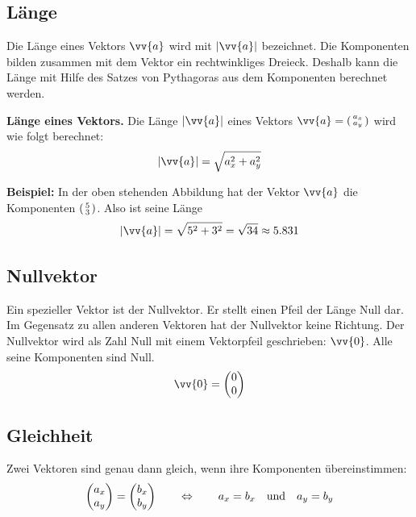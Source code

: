 \subsection{Länge}

Die Länge eines Vektors $\vv{a}$ wird mit $|\vv{a}|$ bezeichnet. Die Komponenten bilden zusammen mit dem Vektor ein rechtwinkliges Dreieck. Deshalb kann die Länge mit Hilfe des Satzes von Pythagoras aus dem Komponenten berechnet werden.

\begin{center}
\end{center}

\begin{theorem}
  \textbf{Länge eines Vektors.} Die Länge $|\vv{a}|$ eines Vektors $\vv{a} = \tvec{a_{x},a_{y}}$ wird wie folgt berechnet:
  \[
    |\vv{a}| = \sqrt{a_{x}^{2}+a_{y}^{2}}
  \]
\end{theorem}

\begin{example}
  \textbf{Beispiel:} In der oben stehenden Abbildung hat der Vektor $\vv{a}$ die Komponenten $\tvec{5,3}$. Also ist seine Länge
  \[
    |\vv{a}| = \sqrt{5^{2}+3^{2}} = \sqrt{34} \approx 5.831
  \]
\end{example}

\subsection{Nullvektor}

Ein spezieller Vektor ist der Nullvektor. Er stellt einen Pfeil der Länge Null dar. Im Gegensatz zu allen anderen Vektoren hat der Nullvektor keine Richtung. Der Nullvektor wird als Zahl Null mit einem Vektorpfeil geschrieben: $\vv{0}$. Alle seine Komponenten sind Null.
\[
  \vv{0} = \dvec{0,0}
\]

\subsection{Gleichheit}

Zwei Vektoren sind genau dann gleich, wenn ihre Komponenten übereinstimmen:
\[
  \dvec{a_{x},a_{y}} = \dvec{b_{x},b_{y}} \qquad\Leftrightarrow\qquad a_{x} = b_{x} \quad\text{und}\quad a_{y} = b_{y}
\]